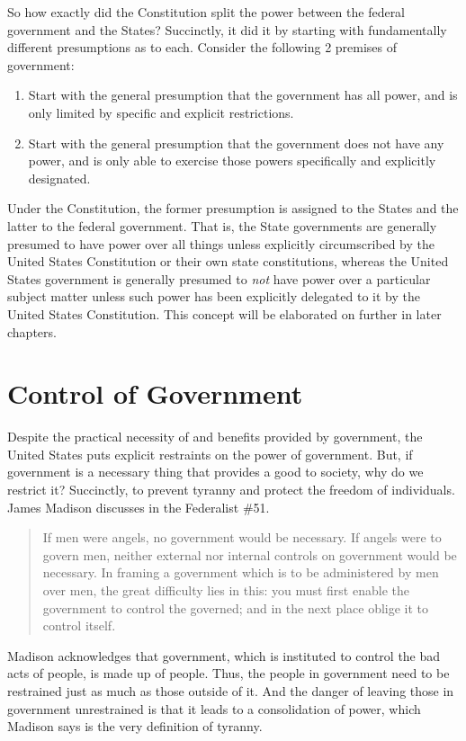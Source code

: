 So how exactly did the Constitution split the power between the federal government and the States?  Succinctly, it did it by starting with fundamentally different presumptions as to each.  Consider the following 2 premises of government:

\begin{enumerate}
\item Start with the general presumption that the government has all power, and is only limited by specific and explicit restrictions.
\item Start with the general presumption that the government does not have any power, and is only able to exercise those powers specifically and explicitly designated.
\end{enumerate}

Under the Constitution, the former presumption is assigned to the States and the latter to the federal government.
That is, the State governments are generally presumed to have power over all things unless explicitly circumscribed by the United States Constitution or their own state constitutions, whereas the United States government is generally presumed to \textit{not} have power over a particular subject matter unless such power has been explicitly delegated to it by the United States Constitution.  This concept will be elaborated on further in later chapters.

\section{Control of Government}

Despite the practical necessity of and benefits provided by government, the United States puts explicit restraints on the power of government.  But, if government is a necessary thing that provides a good to society, why do we restrict it?  Succinctly, to prevent tyranny and protect the freedom of individuals.  James Madison discusses in the Federalist \#51.

\begin{quote}
If men were angels, no government would be necessary. If angels were to govern men, neither external nor internal controls on government would be necessary. In framing a government which is to be administered by men over men, the great difficulty lies in this: you must first enable the government to control the governed; and in the next place oblige it to control itself.
\end{quote}

Madison acknowledges that government, which is instituted to control the bad acts of people, is made up of people.  Thus, the people in government need to be restrained just as much as those outside of it.  And the danger of leaving those in government unrestrained is that it leads to a consolidation of power, which Madison says is the very definition of tyranny.

